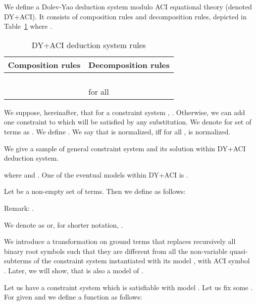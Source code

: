 We define a Dolev-Yao deduction system modulo ACI equational theory  (denoted DY+ACI). 
It consists of composition rules and decomposition rules, depicted in Table~\ref{tab:DYACI} 
where .

\begin{table}[ht]
\centering
\begin{tabular}{|l|l|}
\hline
Composition rules & Decomposition rules \\
\hline
  &  \\
 &  \\
 & \\
 & \\ 
 &  for all  \\
\hline
\end{tabular}
\caption{DY+ACI deduction system rules}\label{tab:DYACI}
\end{table}






We suppose, hereinafter,  that for a constraint system ,  . Otherwise, we can add one constraint  to  which will be satisfied by any substitution.
We denote  for set of terms  as .
We define .
We say that  is normalized, iff for all ,  is normalized. 

\begin{example}\label{ex:constrsys}
 We give a sample of general constraint system and its solution within DY+ACI deduction system.
  
where  and .
 One of the eventual models within DY+ACI is .
\end{example}


\begin{df}\label{def:pairing}
 Let  be a non-empty set of terms. Then we define  as follows:
 
Remark: .
 \end{df}

\begin{df}
We denote  as  or, for shorter notation, .
\end{df}


We introduce a transformation  on ground terms that replaces recursively all binary root symbols such that they are different from
all the non-variable quasi-subterms of the constraint system instantiated with its model ,  with ACI symbol . 
Later, we will show, that  is also a model of .

\begin{df}\label{def:ah}

 Let us have a constraint system  which is satisfiable with model .
 Let us fix some .
 For given  and  we define a function   as follows:




\end{df}

